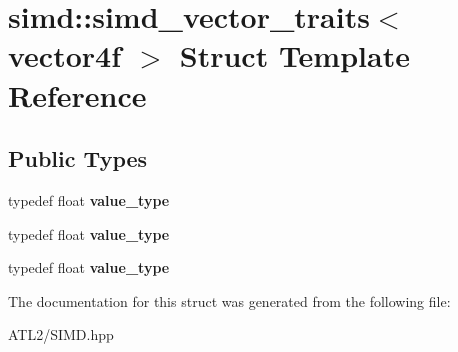 \hypertarget{structsimd_1_1simd__vector__traits_3_01vector4f_01_4}{\section{simd\+:\+:simd\+\_\+vector\+\_\+traits$<$ vector4f $>$ Struct Template Reference}
\label{structsimd_1_1simd__vector__traits_3_01vector4f_01_4}
}
\subsection*{Public Types}
\begin{DoxyCompactItemize}
\item 
\hypertarget{structsimd_1_1simd__vector__traits_3_01vector4f_01_4_ac082ae24e70e8eafd14db9ef431bda1c}{typedef float {\bfseries value\+\_\+type}}\label{structsimd_1_1simd__vector__traits_3_01vector4f_01_4_ac082ae24e70e8eafd14db9ef431bda1c}

\item 
\hypertarget{structsimd_1_1simd__vector__traits_3_01vector4f_01_4_ac082ae24e70e8eafd14db9ef431bda1c}{typedef float {\bfseries value\+\_\+type}}\label{structsimd_1_1simd__vector__traits_3_01vector4f_01_4_ac082ae24e70e8eafd14db9ef431bda1c}

\item 
\hypertarget{structsimd_1_1simd__vector__traits_3_01vector4f_01_4_ac082ae24e70e8eafd14db9ef431bda1c}{typedef float {\bfseries value\+\_\+type}}\label{structsimd_1_1simd__vector__traits_3_01vector4f_01_4_ac082ae24e70e8eafd14db9ef431bda1c}

\end{DoxyCompactItemize}


The documentation for this struct was generated from the following file\+:\begin{DoxyCompactItemize}
\item 
A\+T\+L2/S\+I\+M\+D.\+hpp\end{DoxyCompactItemize}
